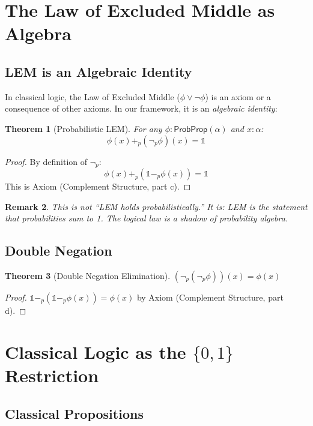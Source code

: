 \documentclass[11pt,a4paper]{article}
\newtheorem{theorem}{Theorem}[section]
\newtheorem{remark}[theorem]{Remark}
\newcommand{\ProbProp}{\mathsf{ProbProp}}
\newcommand{\pnot}{\neg_p}
\newcommand{\pone}{\mathbb{1}}
\newcommand{\padd}{+_p}
\newcommand{\psub}{-_p}
\begin{document}
\section{The Law of Excluded Middle as Algebra}

\subsection{LEM is an Algebraic Identity}

In classical logic, the Law of Excluded Middle ($\phi \lor \neg\phi$) is an axiom or a consequence of other axioms. In our framework, it is an \emph{algebraic identity}:

\begin{theorem}[Probabilistic LEM]
For any $\phi : \ProbProp(\alpha)$ and $x : \alpha$:
\[
\phi(x) \padd (\pnot\phi)(x) = \pone
\]
\end{theorem}

\begin{proof}
By definition of $\pnot$:
\[
\phi(x) \padd (\pone \psub \phi(x)) = \pone
\]
This is Axiom (Complement Structure, part c).
\end{proof}

\begin{remark}
This is not ``LEM holds probabilistically.'' It is: \emph{LEM is the statement that probabilities sum to 1}. The logical law is a shadow of probability algebra.
\end{remark}

\subsection{Double Negation}

\begin{theorem}[Double Negation Elimination]
$(\pnot(\pnot\phi))(x) = \phi(x)$
\end{theorem}

\begin{proof}
$\pone \psub (\pone \psub \phi(x)) = \phi(x)$ by Axiom (Complement Structure, part d).
\end{proof}

\section{Classical Logic as the $\{0,1\}$ Restriction}

\subsection{Classical Propositions}
\end{document}
